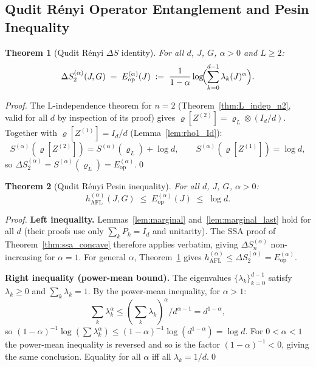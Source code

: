 \documentclass[12pt,a4paper]{article}
\newtheorem{theorem}{Theorem}[section]
\begin{document}
\subsection{Qudit Rényi Operator Entanglement and Pesin Inequality}

\begin{theorem}[Qudit Rényi $\Delta S$ identity]\label{thm:qudit_ds_eop}
For all $d$, $J$, $G$, $\alpha>0$ and $L\ge 2$:
\[
  \Delta S^{(\alpha)}_{2}(J,G)
  \;=\; E^{(\alpha)}_{\mathrm{op}}(J)
  \;:=\; \frac{1}{1-\alpha}\log\!\Bigl(\sum_{k=0}^{d-1}\lambda_{k}(J)^{\alpha}\Bigr).
\]
\end{theorem}

\begin{proof}
The L-independence theorem for $n=2$ (Theorem~\ref{thm:L_indep_n2}, valid for
all $d$ by inspection of its proof) gives
$\varrho[Z^{(2)}]=\varrho_{L}\otimes(I_{d}/d)$.
Together with $\varrho[Z^{(1)}]=I_{d}/d$ (Lemma~\ref{lem:rho1_Id}):
\[
  S^{(\alpha)}(\varrho[Z^{(2)}]) = S^{(\alpha)}(\varrho_{L}) + \log d,
  \qquad
  S^{(\alpha)}(\varrho[Z^{(1)}]) = \log d,
\]
so $\Delta S^{(\alpha)}_{2} = S^{(\alpha)}(\varrho_{L})
= E^{(\alpha)}_{\mathrm{op}}$.\qed
\end{proof}

\begin{theorem}[Qudit Rényi Pesin inequality]\label{thm:qudit_pesin}
For all $d$, $J$, $G$, $\alpha>0$:
\begin{equation}\label{eq:qudit_pesin}
  \boxed{h^{(\alpha)}_{\mathrm{AFL}}(J,G)
  \;\le\; E^{(\alpha)}_{\mathrm{op}}(J)
  \;\le\; \log d.}
\end{equation}
\end{theorem}

\begin{proof}
\textbf{Left inequality.}
Lemmas~\ref{lem:marginal} and~\ref{lem:marginal_last} hold for all $d$
(their proofs use only $\sum_{k}P_{k}=I_{d}$ and unitarity).
The SSA proof of Theorem~\ref{thm:ssa_concave} therefore applies verbatim,
giving $\Delta S^{(\alpha)}_{n}$ non-increasing for $\alpha=1$.
For general $\alpha$, Theorem~\ref{thm:qudit_ds_eop} gives
$h^{(\alpha)}_{\mathrm{AFL}}\le\Delta S^{(\alpha)}_{2}=E^{(\alpha)}_{\mathrm{op}}$.

\textbf{Right inequality (power-mean bound).}
The eigenvalues $\{\lambda_{k}\}_{k=0}^{d-1}$ satisfy $\lambda_{k}\ge 0$ and
$\sum_{k}\lambda_{k}=1$.  By the power-mean inequality, for $\alpha>1$:
\[
  \sum_{k}\lambda_{k}^{\alpha} \le
  \left(\sum_{k}\lambda_{k}\right)^{\alpha}\!/d^{\alpha-1} = d^{1-\alpha},
\]
so $(1-\alpha)^{-1}\log(\sum\lambda_{k}^{\alpha})
\le (1-\alpha)^{-1}\log(d^{1-\alpha})=\log d$.
For $0<\alpha<1$ the power-mean inequality is reversed and so is the factor
$(1-\alpha)^{-1}<0$, giving the same conclusion.  Equality for all $\alpha$
iff all $\lambda_{k}=1/d$.\qed
\end{proof}
\end{document}
